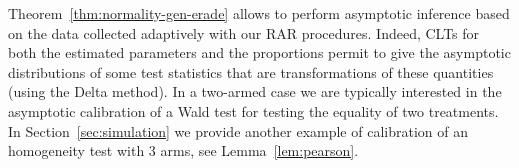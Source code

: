 Theorem~\ref{thm:normality-gen-erade} allows to perform asymptotic inference based on the data collected adaptively with our RAR procedures. Indeed, CLTs for both the estimated parameters and the proportions permit to give the asymptotic distributions of some test statistics that are transformations of these quantities (using the Delta method). In a two-armed case we are typically interested in the asymptotic calibration of a Wald test for testing the equality of two treatments. In Section~\ref{sec:simulation} we provide another example of calibration of an homogeneity test with 3 arms, see Lemma~\ref{lem:pearson}.

